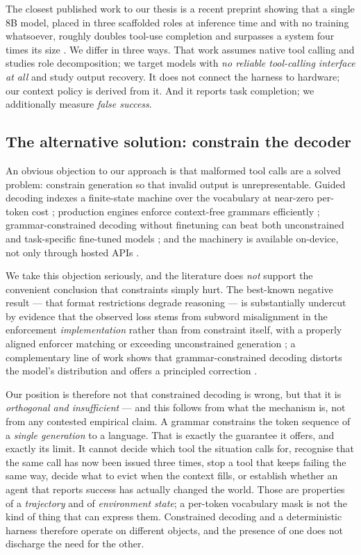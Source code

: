 \documentclass[11pt,a4paper]{article}
\begin{document}
The closest published work to our thesis is a recent preprint showing that a
single 8B model, placed in three scaffolded roles at inference time and with no
training whatsoever, roughly doubles tool-use completion and surpasses a system
four times its size \citep{mcclendon2026threeroles}. We differ in three ways.
That work assumes native tool calling and studies role decomposition; we target
models with \emph{no reliable tool-calling interface at all} and study output
recovery. It does not connect the harness to hardware; our context policy is
derived from it. And it reports task completion; we additionally measure
\emph{false success}.

\subsection{The alternative solution: constrain the decoder}

An obvious objection to our approach is that malformed tool calls are a solved
problem: constrain generation so that invalid output is unrepresentable. Guided
decoding indexes a finite-state machine over the vocabulary at near-zero
per-token cost \citep{willard2023outlines}; production engines enforce
context-free grammars efficiently \citep{dong2025xgrammar}; grammar-constrained
decoding without finetuning can beat both unconstrained and task-specific
fine-tuned models \citep{geng2023grammar}; and the machinery is available
on-device, not only through hosted APIs \citep{llamacpp}.

We take this objection seriously, and the literature does \emph{not} support the
convenient conclusion that constraints simply hurt. The best-known negative
result --- that format restrictions degrade reasoning \citep{tam2024speak} ---
is substantially undercut by evidence that the observed loss stems from subword
misalignment in the enforcement \emph{implementation} rather than from constraint
itself, with a properly aligned enforcer matching or exceeding unconstrained
generation \citep{beurer-kellner2024guiding}; a complementary line of work shows
that grammar-constrained decoding distorts the model's distribution and offers a
principled correction \citep{park2024grammar}.

Our position is therefore not that constrained decoding is wrong, but that it is
\emph{orthogonal and insufficient} --- and this follows from what the mechanism
is, not from any contested empirical claim. A grammar constrains the token
sequence of a \emph{single generation} to a language. That is exactly the
guarantee it offers, and exactly its limit. It cannot decide which tool the
situation calls for, recognise that the same call has now been issued three times,
stop a tool that keeps failing the same way, decide what to evict when the context
fills, or establish whether an agent that reports success has actually changed the
world. Those are properties of a \emph{trajectory} and of \emph{environment
state}; a per-token vocabulary mask is not the kind of thing that can express
them. Constrained decoding and a deterministic harness therefore operate on
different objects, and the presence of one does not discharge the need for the
other.
\end{document}
